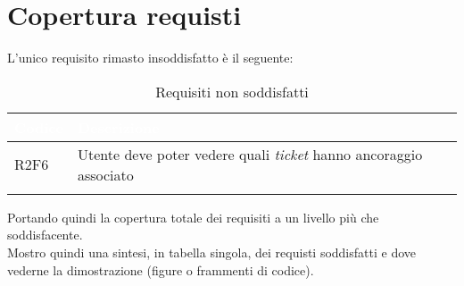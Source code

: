 \section{Copertura requisti}
L'unico requisito rimasto insoddisfatto è il seguente:

{
    \setlength{\freewidth}{\dimexpr\textwidth-10\tabcolsep}
    \renewcommand{\arraystretch}{1.5}
    \centering
    \setlength{\aboverulesep}{0pt}
    \setlength{\belowrulesep}{0pt}
    \begin{longtable}{C{.15\freewidth} C{.965\freewidth}} 
       \toprule
    \textcolor{white}{\textbf{Codice}}&
    \textcolor{white}{\textbf{Descrizione}}\\
    \toprule
    \endhead

    R2F6 & Utente deve poter vedere quali \textit{ticket} hanno ancoraggio associato\\

    \bottomrule
    \caption{Requisiti non soddisfatti}
    \end{longtable}
}

Portando quindi la copertura totale dei requisiti a un livello più che soddisfacente.\\
Mostro quindi una sintesi, in tabella singola, dei requisti soddisfatti e dove vederne la dimostrazione (figure o frammenti di codice).

